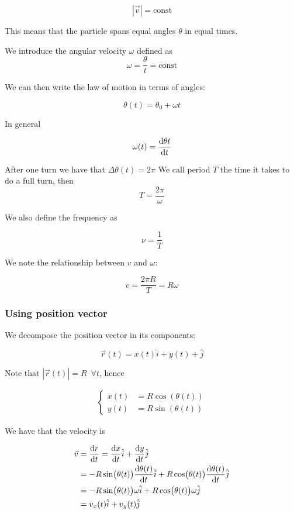 \documentclass[10pt]{extarticle}
\begin{document}
$$
    |\vec v| = \text{const}
$$

This means that the particle spans equal angles $\theta$ in equal times.

We introduce the angular velocity $\omega$ defined as
$$
    \omega = \frac{\theta}{t} = \text{const}
$$

We can then write the law of motion in terms of angles:

$$
    \theta(t) = \theta_0 + \omega t
$$

In general

$$
    \omega (t) = \dv{\theta t}{t}
$$

After one turn we have that $\Delta \theta (t) = 2 \pi$
We call period $T$ the time it takes to do a full turn, then
$$
    T = \frac{2 \pi}{\omega}
$$

We also define the frequency as

$$
    \nu = \frac{1}{T}
$$

We note the relationship between $v$ and $\omega$:

$$
    v = \frac{2 \pi R}{T} = R \omega
$$

\subsubsection{Using position vector}

We decompose the position vector in its components:

$$
    \vec{r}(t) = x (t) \hat i  + y(t) + \hat j
$$

Note that $|\vec r (t)| = R \enspace \forall t$, hence

\begin{align*}
    \begin{cases}
        x(t) & = R \cos (\theta (t)) \\
        y(t) & = R \sin (\theta (t))
    \end{cases}
\end{align*}

We have that the velocity is

\begin{align*}
    \vec v & = \dv {r}{t} = \dv{x}{t} \hat i + \dv {y}{t} \hat j                     \\
           & = - R \sin (\theta(t)) \dv{\theta(t)}{t} \hat i
    + R \cos (\theta(t)) \dv{\theta(t)}{t} \hat j                                    \\
           & = - R \sin (\theta(t)) \omega \hat i + R \cos (\theta(t)) \omega \hat j \\
           & = v_x (t) \hat i + v_y (t) \hat j
\end{align*}
\end{document}
